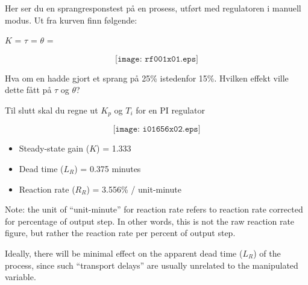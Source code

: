 


Her ser du en sprangresponstest på en prosess, utført med regulatoren i manuell modus. Ut fra kurven finn følgende:

$K$ = \underbar{\hskip 50pt} \hskip 50pt $\tau$ = \underbar{\hskip 50pt} \hskip 50pt $\theta$ = \underbar{\hskip 50pt}

$$\texttt{[image: rf001x01.eps]}$$


\vskip 10pt

Hva om en hadde gjort et sprang på 25\% istedenfor 15\%.  Hvilken effekt ville dette fått på $\tau$ og $\theta$?

\vskip 10pt

Til slutt skal du regne ut $K_p$ og $T_i$ for en PI regulator







$$\texttt{[image: i01656x02.eps]}$$

\begin{itemize}
\item{}Steady-state gain ($K$) = 1.333
\vskip 5pt
\item{}Dead time ($L_R$) = 0.375 minutes
\vskip 5pt
\item{}Reaction rate ($R_R$) = 3.556\% / unit-minute
\end{itemize} 

\vskip 10pt

Note: the unit of ``unit-minute'' for reaction rate refers to reaction rate corrected for percentage of output step.  In other words, this is not the raw reaction rate figure, but rather the reaction rate per percent of output step.

\vskip 10pt

Ideally, there will be minimal effect on the apparent dead time ($L_R$) of the process, since such ``transport delays'' are usually unrelated to the manipulated variable.
 
